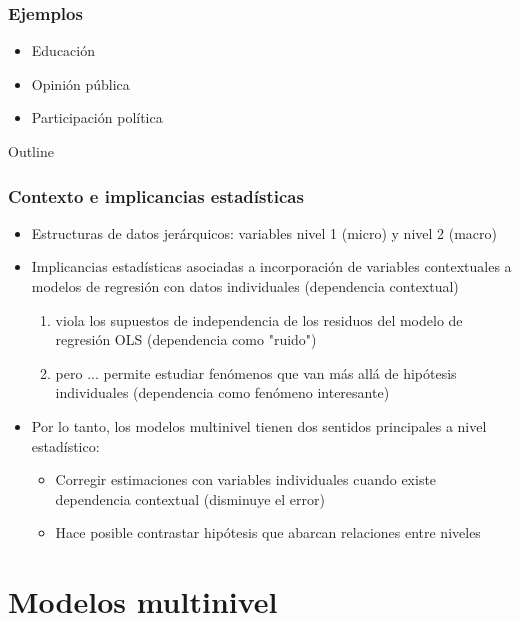 \documentclass[]{beamer} %
\begin{document}
	\begin{frame}%
		\frametitle{Ejemplos}
		\begin{itemize}%
			\item Educación
			\item Opinión pública
			\item Participación política
		\end{itemize}
	\end{frame}

	\begin{frame}[allowframebreaks]{Outline}
		\frametitle{Contexto e implicancias estadísticas}
		\begin{itemize}%
			\item Estructuras de datos jerárquicos: variables nivel 1 (micro) y nivel 2 (macro)
			\item Implicancias estadísticas asociadas a incorporación de variables contextuales a modelos de regresión con datos individuales (dependencia contextual)
					\begin{enumerate}%
						\item viola los supuestos de independencia de los residuos del modelo de regresión OLS (dependencia como "ruido")
						\item pero ... permite estudiar fenómenos que van más allá de hipótesis individuales (dependencia como fenómeno interesante)
					\end{enumerate}

		\framebreak

			\item Por lo tanto, los modelos multinivel tienen dos sentidos principales a nivel estadístico:
					\begin{itemize}%
						\item Corregir estimaciones con variables individuales cuando existe dependencia contextual (disminuye el error)
						\item Hace posible contrastar hipótesis que abarcan relaciones entre niveles
					\end{itemize}


		\end{itemize}
	\end{frame}

\section{Modelos multinivel}
\end{document}
